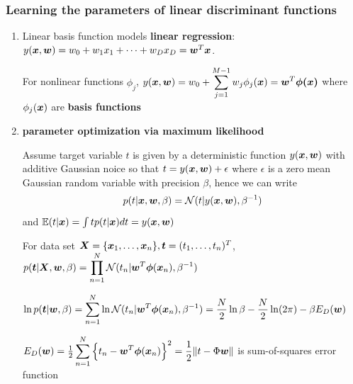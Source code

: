 \documentclass[11pt]{article}
\begin{document}
\subsubsection{Learning the parameters of linear discriminant functions}
\label{sec:orgb625ceb}
\begin{enumerate}
\item Linear basis function models
\label{sec:org46dc0f8}
\textbf{linear regression}:
\(y(\boldsymbol{x},\boldsymbol{w})=w_0+w_1x_1+\dots+w_Dx_D=\boldsymbol{w}^T\boldsymbol{x}\).

For nonlinear functions \(\phi_j\),
\(y(\boldsymbol{x},\boldsymbol{w})=w_0+\displaystyle\sum_{j=1}^{M-1}
     w_j\phi_j(\boldsymbol{x})=\boldsymbol{w}^T\boldsymbol{\phi(\boldsymbol{x})}\) where \(\phi_j(\boldsymbol{x})\) are
\textbf{basis functions} 
\item \textbf{parameter optimization via maximum likelihood}
\label{sec:orgc9d9d7d}

Assume target variable \(t\) is given by a deterministic function
\(y(\boldsymbol{x},\boldsymbol{w})\) with additive Gaussian noice so that
\(t=y(\boldsymbol{x},\boldsymbol{w})+\epsilon\) where \(\epsilon\) is a zero mean Gaussian
random variable with precision \(\beta\), hence we can write
\begin{equation*}
p(t|\boldsymbol{x},\boldsymbol{w},\beta)=\mathcal{N}(t|y(\boldsymbol{x},\boldsymbol{w}),\beta^{-1})
\end{equation*}
and \(\mathbb{E}(t|\boldsymbol{x})=\int tp(t|\boldsymbol{x})dt=y(\boldsymbol{x},\boldsymbol{w})\)

For data set \(\boldsymbol{X}=\{\boldsymbol{x}_1,\dots,\boldsymbol{x}_n\},\boldsymbol{t}=(t_1,\dots,t_n)^T\),
\(p(\boldsymbol{t}|\boldsymbol{X},\boldsymbol{w},\beta)=\displaystyle\prod_{n=1}^N\mathcal{N}(t_n|
     \boldsymbol{w}^T\boldsymbol{\phi}(\boldsymbol{x}_n),\beta^{-1})\)

\(\ln p(\boldsymbol{t}|\boldsymbol{w},\beta)=\displaystyle\sum_{n=1}^N\ln\mathcal{N}(t_n|
     \boldsymbol{w}^T\boldsymbol{\phi}(\boldsymbol{x}_n),\beta^{-1})=\frac{N}{2}\ln\beta-\frac{N}{2}\ln(2\pi)-
     \beta E_D(\boldsymbol{w})\)

\(E_D(\boldsymbol{w})=\frac{1}{2}\displaystyle\sum_{n=1}^N
     \left\{t_n-\boldsymbol{w}^T\boldsymbol{\phi}(\boldsymbol{x}_n)\right\}^2=
     \frac{1}{2}\norm{t-\Phi\boldsymbol{w}}\) is sum-of-squares error function


\end{enumerate}
\end{document}
